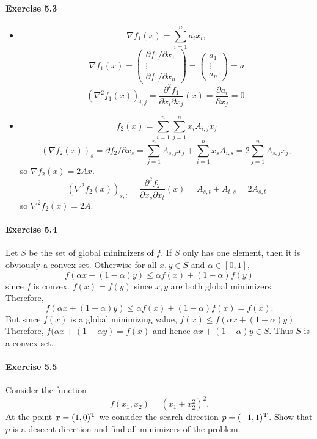 \paragraph{Exercise 5.3} %
\begin{itemize}
\item
\[
\nabla f_1(x) = \sum_{i=1}^n a_i x_i,
\]
\[
\nabla f_1(x) =
\begin{pmatrix}
\partial f_1/\partial x_1\\
\vdots\\
\partial f_1/\partial x_n
\end{pmatrix}
=
\begin{pmatrix}
a_1\\
\vdots\\
a_n
\end{pmatrix}
=
a
\]
\[
(\nabla^2 f_1(x))_{i,j}
= \frac{\partial^2 f_1}{\partial x_i \partial x_j}(x)
= \frac{\partial a_i}{\partial x_j}
= 0.
\]

\item
\[
f_2(x) = \sum_{i=1}^n \sum_{j=1}^n x_i A_{i,j} x_j
\]
\[
(\nabla f_2(x))_s
= \partial f_2/\partial x_s
= \sum_{j=1}^n A_{s,j} x_j + \sum_{i=1}^n x_s A_{i,s}
= 2\sum_{j=1}^n A_{s,j} x_j,
\]
so $\nabla f_2(x) = 2Ax$.
\[
(\nabla^2 f_2(x))_{s, t}
= \frac{\partial^2 f_2}{\partial x_s \partial x_t}(x)
= A_{s,t} + A_{t,s}
= 2 A_{s,t}
\]
so $\nabla^2 f_2(x) = 2A$.
\end{itemize}

\paragraph{Exercise 5.4} %
Let $S$ be the set of global minimizers of $f$. If $S$ only has one element,
then it is obviously a convex set. Otherwise for all $x, y \in S$ and
$\alpha\in [0, 1]$,
\[
f (\alpha x + (1 - \alpha)y) \le \alpha f(x) + (1 - \alpha)f (y)
\]
since $f$ is convex. $f(x) = f(y)$ since $x, y$ are both global minimizers.
Therefore,
\[
f (\alpha x + (1 - \alpha)y) \le \alpha f (x) + (1 - \alpha)f (x) = f (x).
\]
But since $f (x)$ is a global minimizing value, $f (x) \le f (\alpha x + (1 -
\alpha)y)$.  Therefore, $f (\alpha x + (1 - \alpha y) = f (x)$ and hence
$\alpha x + (1 - \alpha )y \in S$. Thus $S$ is a convex set.


\paragraph{Exercise 5.5} %
Consider the function
\[
  f(x_1, x_2) = (x_1+x_2^2)^2.
\]
At the point $x=(1,0)^{\text{\upshape T}}$ we consider the search direction $p=(-1,1)^{\text{\upshape T}}$.
Show that $p$ is a descent direction and find all minimizers of the problem.

